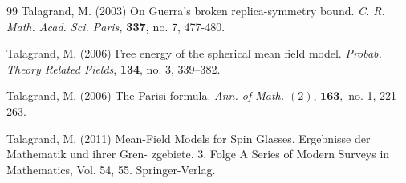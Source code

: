 \documentclass[12pt]{article}
\newenvironment{Proof of lemma}{\noindent{\bf Proof of Lemma}}{\hfill$\Box$\newline}
\newenvironment{Proof of theorem}{\noindent{\bf Proof of Theorem}}{\hfill{\footnotesize${\square}$}\newline}
\newenvironment{Proof of theorems}{\noindent{\bf Proof of Theorems}}{\hfill$\Box$\newline}
\newenvironment{Proof of proposition}{\noindent{\bf Proof of Proposition}}{\hfill$\Box$\newline}
\newenvironment{Proof of propositions}{\noindent{\bf Proof of Propositions}}{\hfill$\Box$\newline}
\newenvironment{Proof of exercise}{\noindent{\it Proof of Exercise:}}{\hfill$\Box$}
\numberwithin{equation}{section}
\begin{document}
\begin{thebibliography}{99}
Talagrand, M. (2003) On Guerra's broken replica-symmetry bound. {\it C. R. Math. Acad. Sci. Paris,} {\bf 337,} no. 7, 477-480.

Talagrand, M. (2006) Free energy of the spherical mean field model. {\it Probab. Theory Related Fields}, {\bf 134}, no. 3, 339–382. 

Talagrand, M. (2006) The Parisi formula. {\it Ann. of Math. $(2)$}, $\mathbf{163},$ no. 1, 221-263.

Talagrand, M. (2011) Mean-Field Models for Spin Glasses. Ergebnisse der Mathematik und ihrer Gren-
zgebiete. 3. Folge A Series of Modern Surveys in Mathematics, Vol. 54, 55. Springer-Verlag.

\end{thebibliography}
\end{document}
